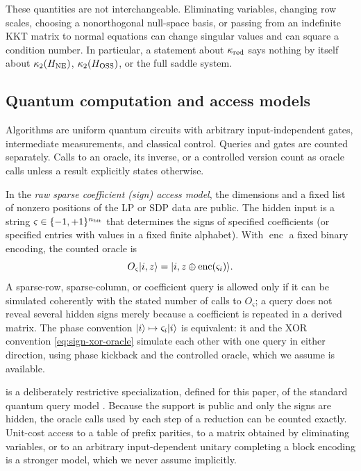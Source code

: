 These quantities are not interchangeable.  Eliminating variables, changing
row scales, choosing a nonorthogonal null-space basis, or passing from an
indefinite KKT matrix to normal equations can change singular values and can
square a condition number.  In particular, a statement about
$\kappa_{\rm red}$ says nothing by itself about
$\kappa_2(H_{\rm NE})$, $\kappa_2(H_{\rm OSS})$, or the full saddle system.

\subsection{Quantum computation and access models}
\label{sec:prelim-quantum-access}

Algorithms are uniform quantum circuits with arbitrary input-independent
gates, intermediate measurements, and classical control.  Queries and gates
are counted separately.  Calls to an oracle, its inverse, or a controlled
version count as oracle calls unless a result explicitly states otherwise.

\begin{definition}
\label{def:raw-sparse-access}
In the \emph{raw sparse coefficient (sign) access model}, the dimensions and a
fixed list of nonzero positions of the LP or SDP data are public.  The hidden
input is a string $\varsigma\in\{-1,+1\}^{n_{\rm bit}}$ that determines the signs
of specified coefficients (or specified entries with values in a fixed
finite alphabet).  With $\operatorname{enc}$ a fixed binary encoding, the
counted oracle is
\begin{equation}
 O_\varsigma\lvert i,z\rangle=\lvert i,z\mathbin\oplus\operatorname{enc}(\varsigma_i)\rangle.
 \label{eq:sign-xor-oracle}
\end{equation}
A sparse-row, sparse-column, or coefficient query is allowed only if it
can be simulated coherently with the stated number of calls to
$O_\varsigma$; a query does not reveal several hidden signs merely because a
coefficient is repeated in a derived matrix.  The phase convention $\lvert i\rangle\mapsto\varsigma_i\lvert i\rangle$ is equivalent: it
and the XOR convention \eqref{eq:sign-xor-oracle} simulate each other with
one query in either direction, using phase kickback and the controlled
oracle, which we assume is available.
\end{definition}

\begin{remark}
 is a deliberately restrictive
specialization, defined for this paper, of the standard quantum query model
\cite{beals2001-quantum-lower-bounds-by-polynomials}.  Because the support is
public and only the signs are hidden, the oracle calls used by each step of a
reduction can be counted exactly.  Unit-cost access to a table of prefix
parities, to a matrix obtained by eliminating variables, or to an arbitrary
input-dependent unitary completing a block encoding is a stronger model, which
we never assume implicitly.
\end{remark}

